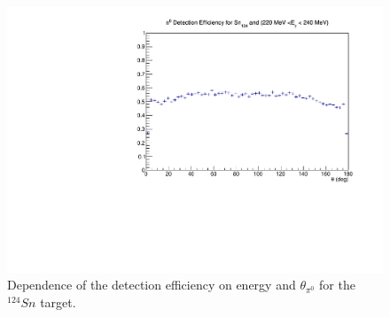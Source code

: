 \begin{figure}[H]
\begin{center}
\includegraphics[scale=0.4]{pictures/pdf/pi0_efficiency_Sn124_Ebin9.pdf}
\caption{Dependence of the detection efficiency on energy and $\theta_{\pi^{0}}$ for the $^{124}Sn$ target.}
\label{detectioneff3}
\end{center}
\end{figure}






